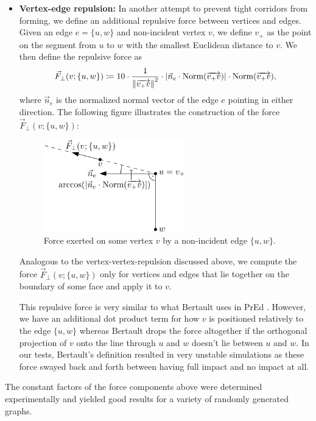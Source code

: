 \begin{itemize}
\item \textbf{Vertex-edge repulsion:} %
In another attempt to prevent tight corridors from forming, we define an additional repulsive force between vertices and edges.
Given an edge $e = \{u,w\}$ and non-incident vertex $v$, we define $v_+$ as the point on the segment from $u$ to $w$ with the smallest Euclidean distance to $v$.
We then define the repulsive force as
%
\begin{equation}
	\vec{F}_\bot(v;\{u,w\}) \coloneqq
	10 \cdot \frac{1}{\left\lVert\overrightarrow{v_+v}\right\rVert^2}
	\cdot \left\lvert\vec{n}_e \cdot \operatorname{Norm}(\overrightarrow{v_+v})\right\rvert
	\cdot \operatorname{Norm}(\overrightarrow{v_+v})
	,
\end{equation}
%
where $\vec{n}_e$ is the normalized normal vector of the edge $e$ pointing in either direction.
The following figure illustrates the construction of the force $\vec{F}_\bot(v;\{u,w\})$:
%
\begin{figure}[H]
	\centering
	\includegraphics[height=40mm]{Resources/Drawing-Forces-VertexEdgeRepulsion.pdf}
	\caption{Force exerted on some vertex $v$ by a non-incident edge $\{u,w\}$.}
	\label{fig:drawing-forces-vertex-edge-repulsion}
\end{figure}

Analogous to the vertex-vertex-repulsion discussed above, we compute the force $\vec{F}_\bot(v;\{u,w\})$ only for vertices and edges that lie together on the boundary of some face and apply it to $v$.

This repulsive force is very similar to what Bertault uses in PrEd \cite{bertault1999force}.
However, we have an additional dot product term for how $v$ is positioned relatively to the edge $\{u,w\}$ whereas Bertault drops the force altogether if the orthogonal projection of $v$ onto the line through $u$ and $w$ doesn't lie between $u$ and $w$.
In our tests, Bertault's definition resulted in very unstable simulations as these force swayed back and forth between having full impact and no impact at all.
\end{itemize}

The constant factors of the force components above were determined experimentally and yielded good results for a variety of randomly generated graphs.

